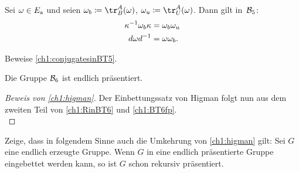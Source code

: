 \begin{thLemma}\label{ch1:conjugatesinBT5}
    Sei $\omega\in E_{\mathrm a}$ und seien $\omega_b \defeq \tr^A_B(\omega)$,
    $\omega_u \defeq \tr^A_U(\omega)$. Dann gilt in~$\mathcal{B}_5$:
    \begin{align*}
        \kappa^{-1} \omega_b \kappa &= \omega_b\omega_u  \\
        d \omega d^{-1} &= \omega\omega_b
    . \end{align*}
\end{thLemma}

\begin{thAufgabe}
    Beweise \cref{ch1:conjugatesinBT5}.
\end{thAufgabe}

\begin{thProposition}
    \label{ch1:BT6fp}
    Die Gruppe $\mathcal{B}_6$ ist endlich präsentiert.
\end{thProposition}

\begin{proof}[Beweis von \cref{ch1:higman}]
    Der Einbettungssatz von Higman folgt nun aus dem zweiten Teil von
    \cref{ch1:RinBT6} und \cref{ch1:BT6fp}.
    \\
\end{proof}

\begin{thAufgabe}
    Zeige, dass in folgendem Sinne auch die Umkehrung von \cref{ch1:higman}
    gilt: Sei $G$ eine endlich erzeugte Gruppe. Wenn $G$ in eine endlich
    präsentierte Gruppe eingebettet werden kann, so ist $G$ schon rekursiv
    präsentiert.
\end{thAufgabe}
